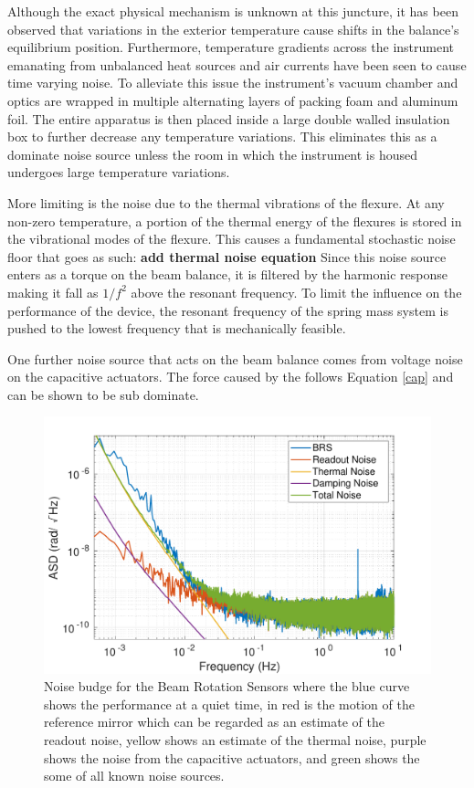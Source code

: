 \documentclass [12pt, proquest]{uwthesis}[2019]
\begin{document}
Although the exact physical mechanism is unknown at this juncture, it has been observed that variations in the exterior temperature cause shifts in the balance's equilibrium position. Furthermore, temperature gradients across the instrument emanating from unbalanced heat sources and air currents have been seen to cause time varying noise. To alleviate this issue the instrument's vacuum chamber and optics are wrapped in multiple alternating layers of packing foam and aluminum foil. The entire apparatus is then placed inside a large double walled insulation box to further decrease any temperature variations. This eliminates this as a dominate noise source unless the room in which the instrument is housed undergoes large temperature variations.

More limiting is the noise due to the thermal vibrations of the flexure. At any non-zero temperature, a portion of the thermal energy of the flexures is stored in the vibrational modes of the flexure. This causes a fundamental stochastic noise floor that goes as such:
\textbf{add thermal noise equation}
 Since this noise source enters as a torque on the beam balance, it is filtered by the harmonic response making it fall as $1/f^2$ above the resonant frequency. To limit the influence on the performance of the device, the resonant frequency of the spring mass system is pushed to the lowest frequency that is mechanically feasible. 
 
 One further noise source that acts on the beam balance comes from voltage noise on the capacitive actuators. The force caused by the follows Equation \ref{cap} and can be shown to be sub dominate.
 
 \begin{figure}%
\begin{center}
\includegraphics[width=\textwidth]{BRSNoiseBudget.pdf}
\caption{Noise budge for the Beam Rotation Sensors where the blue curve shows the performance at a quiet time, in red is the motion of the reference mirror which can be regarded as an estimate of the readout noise, yellow shows an estimate of the thermal noise, purple shows the noise from the capacitive actuators, and green shows the some of all known noise sources.}
\label{noise}
\end{center}
\end{figure}
\end{document}
